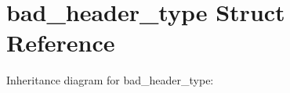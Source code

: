 \hypertarget{structbad__header__type}{}\section{bad\+\_\+header\+\_\+type Struct Reference}
\label{structbad__header__type}


Inheritance diagram for bad\+\_\+header\+\_\+type\+:
